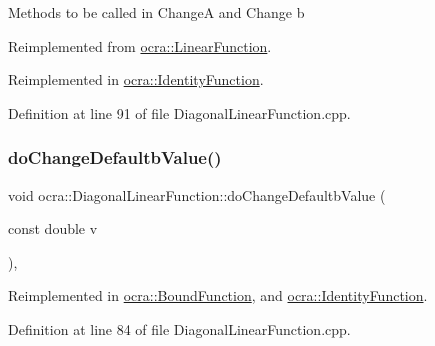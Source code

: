 Methods to be called in ChangeA and Change b 

Reimplemented from \hyperlink{classocra_1_1LinearFunction_ab573c2f615d2edefb647979d3cc3cf46}{ocra\+::\+Linear\+Function}.



Reimplemented in \hyperlink{classocra_1_1IdentityFunction_aa1a9f42b9b1b62182d99ea32dae6e815}{ocra\+::\+Identity\+Function}.



Definition at line 91 of file Diagonal\+Linear\+Function.\+cpp.

\hypertarget{classocra_1_1DiagonalLinearFunction_a9995af94055dc443c10018869a393635}{}\label{classocra_1_1DiagonalLinearFunction_a9995af94055dc443c10018869a393635} 
\subsubsection{\texorpdfstring{do\+Change\+Defaultb\+Value()}{doChangeDefaultbValue()}}
{\footnotesize\ttfamily void ocra\+::\+Diagonal\+Linear\+Function\+::do\+Change\+Defaultb\+Value (\begin{DoxyParamCaption}\item[{const double}]{v }\end{DoxyParamCaption})\hspace{0.3cm}{\ttfamily [protected]}, {\ttfamily [virtual]}}



Reimplemented in \hyperlink{classocra_1_1BoundFunction_aa861028f4a37e45b4fc68b7852d7e451}{ocra\+::\+Bound\+Function}, and \hyperlink{classocra_1_1IdentityFunction_a989f91f6ec4e2e00aa5ac3cc8b6a2b66}{ocra\+::\+Identity\+Function}.



Definition at line 84 of file Diagonal\+Linear\+Function.\+cpp.

\hypertarget{classocra_1_1DiagonalLinearFunction_a81120f5a61cc53cc940f4e71b35174ff}{}\label{classocra_1_1DiagonalLinearFunction_a81120f5a61cc53cc940f4e71b35174ff} 
